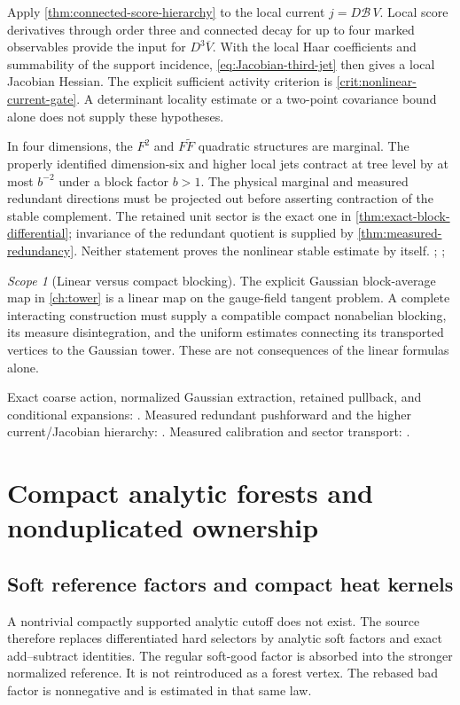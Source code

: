 \documentclass[11pt,oneside,openany]{book}
\theoremstyle{definition}
\theoremstyle{remark}
\newtheorem{scope}[scope]{Scope}
\newcommand{\src}[2]{\cite[#2]{#1}}
\newcommand{\sourcebasis}[1]{\par\smallskip\noindent #1\par}
\begin{document}
Apply \cref{thm:connected-score-hierarchy} to the local current
$j=D\mathcal B\,V$. Local score derivatives through order three and
connected decay for up to four marked observables provide the input
for $D^3\overline V$. With the local Haar coefficients and summability
of the support incidence, \cref{eq:Jacobian-third-jet} then gives a
local Jacobian Hessian. The explicit sufficient activity criterion is
\cref{crit:nonlinear-current-gate}. A determinant locality estimate or
a two-point covariance bound alone does not supply these hypotheses.

In four dimensions, the $F^2$ and $F\widetilde F$ quadratic structures
are marginal. The properly identified dimension-six and higher local
jets contract at tree level by at most $b^{-2}$ under a block factor
$b>1$. The physical marginal and measured redundant directions must
be projected out before asserting contraction of the stable
complement. The retained unit sector is the exact one in
\cref{thm:exact-block-differential}; invariance of the redundant quotient
is supplied by \cref{thm:measured-redundancy}. Neither statement proves
the nonlinear stable estimate by itself. \src{F7}{V99--V100};
\src{F8}{V58--V61}; \src{F9}{V9--V11}

\begin{scope}[Linear versus compact blocking]
The explicit Gaussian block-average map in \cref{ch:tower} is a linear map on the gauge-field tangent problem. A complete interacting construction must supply a compatible compact nonabelian blocking, its measure disintegration, and the uniform estimates connecting its transported vertices to the Gaussian tower. These are not consequences of the linear formulas alone.
\end{scope}
\sourcebasis{Exact coarse action, normalized Gaussian extraction, retained pullback, and conditional expansions: \src{F7}{V92--V100}. Measured redundant pushforward and the higher current/Jacobian hierarchy: \src{F8}{V58--V61}. Measured calibration and sector transport: \src{F9}{V9--V11}.}

\chapter{Compact analytic forests and nonduplicated ownership}
\label{ch:forests}
\section{Soft reference factors and compact heat kernels}
A nontrivial compactly supported analytic cutoff does not exist. The source therefore replaces differentiated hard selectors by analytic soft factors and exact add--subtract identities. The regular soft-good factor is absorbed into the stronger normalized reference. It is not reintroduced as a forest vertex. The rebased bad factor is nonnegative and is estimated in that same law.
\end{document}
